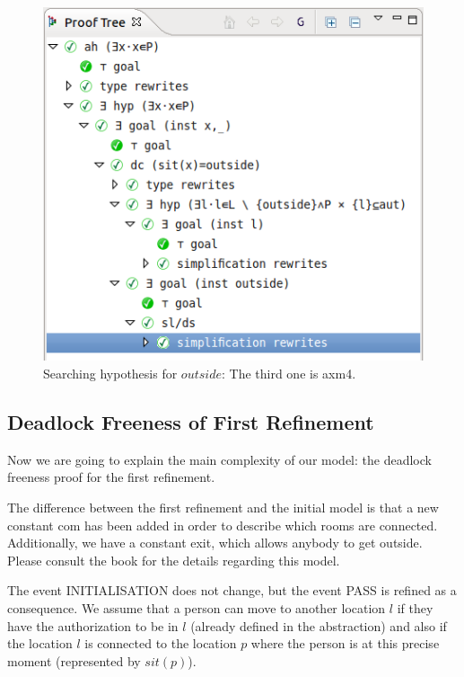 \begin{figure}[!ht]
  \begin{center}
    \includegraphics{img/tutorial/tut_10_proof_tree_final.png}
    \caption{Searching hypothesis for $outside$: The third one is \textsf{axm4}.}
    \label{fig_tut_10_final_proof_tree}
  \end{center}
\end{figure}



\subsection{Deadlock Freeness of First Refinement}
\label{tut_location_first_refinement}

Now we are going to explain the main complexity of our model: the deadlock freeness proof for the first refinement. 


The difference between the first refinement and the initial model is that a new constant \textsf{com} has been added in order to describe which rooms are connected. Additionally, we have a constant \textsf{exit}, which allows anybody to get outside.  Please consult the book for the details regarding this model.

The event \textsf{INITIALISATION} does not change, but the event \textsf{PASS} is refined as a consequence. We assume that a person can move to another location $l$ if they have the authorization to be in $l$ (already defined in the abstraction) and also if the location $l$ is connected to the location $p$ where the person is at this precise moment (represented by $sit(p)$).

